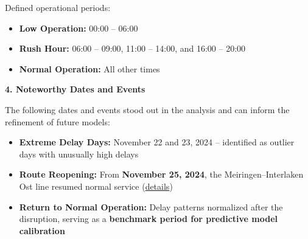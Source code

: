 \documentclass[
]{article}
\providecommand{\tightlist}{%
  \setlength{\itemsep}{0pt}\setlength{\parskip}{0pt}}
\begin{document}
Defined operational periods:

\begin{itemize}
\tightlist
\item
  \textbf{Low Operation:} 00:00 -- 06:00\\
\item
  \textbf{Rush Hour:} 06:00 -- 09:00, 11:00 -- 14:00, and 16:00 --
  20:00\\
\item
  \textbf{Normal Operation:} All other times
\end{itemize}

\textbf{4. Noteworthy Dates and Events}

The following dates and events stood out in the analysis and can inform
the refinement of future models:

\begin{itemize}
\tightlist
\item
  \textbf{Extreme Delay Days:} November 22 and 23, 2024 -- identified as
  outlier days with unusually high delays\\
\item
  \textbf{Route Reopening:} From \textbf{November 25, 2024}, the
  Meiringen--Interlaken Ost line resumed normal service
  (\href{https://www.zentralbahn.ch/de/kennenlernen/die-zentralbahn/einblicke/wiedereroeffnung-der-strecke-meiringen-interlaken-ost-am-25-november-2024}{details})\\
\item
  \textbf{Return to Normal Operation:} Delay patterns normalized after
  the disruption, serving as a \textbf{benchmark period for predictive
  model calibration}
\end{itemize}
\end{document}
